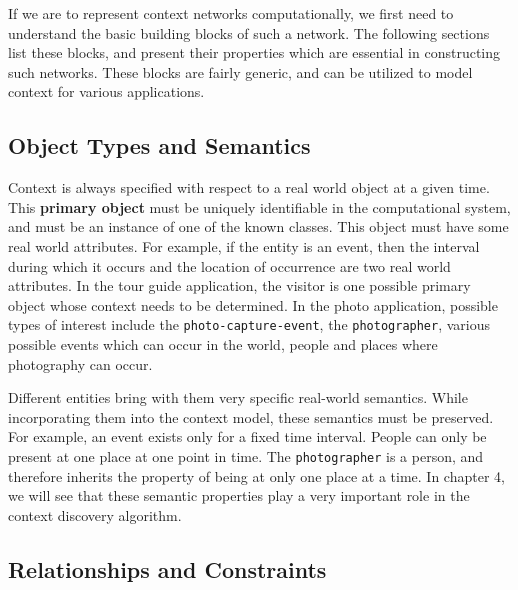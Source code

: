 If we are to represent context networks computationally, we first need to understand the basic building blocks of such a network. The following sections list these blocks, and present their properties which are essential in constructing such networks. These blocks are fairly generic, and can be utilized to model context for various applications.


\subsection{Object Types and Semantics}
Context is always specified with respect to a real world object at a given time. This \textbf{primary object} must be uniquely identifiable in the computational system, and must be an instance of one of the known classes. This object must have some real world attributes. For example, if the entity is an event, then the interval during which it occurs and the location of occurrence are two real world attributes. In the tour guide application, the visitor is one possible primary object whose context needs to be determined. In the photo application, possible types of interest include the \texttt{photo-capture-event}, the \texttt{photographer}, various possible events which can occur in the world, people and places where photography can occur.

Different entities bring with them very specific real-world semantics. While incorporating them into the context model, these semantics must be preserved. For example, an event exists only for a fixed time interval. People can only be present at one place at one point in time. The \texttt{photographer} is a person, and therefore inherits the property of being at only one place at a time. In chapter 4, we will see that these semantic properties play a very important role in the context discovery algorithm.

\subsection{Relationships and Constraints}

